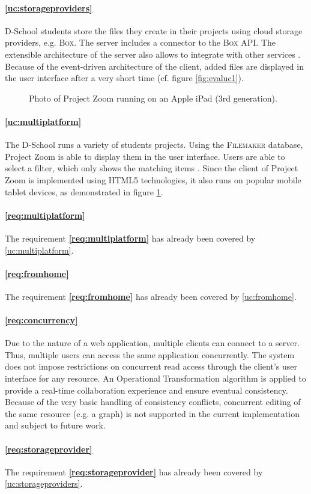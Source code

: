 \paragraph{\ref{uc:storageproviders}} D-School students store the files they create in their projects using cloud storage providers, e.g. \textsc{Box}. The server includes a connector to the \textsc{Box} API. The extensible architecture of the server also allows to integrate with other services \cite{Werkmeister_2013}. Because of the event-driven architecture of the client, added files are displayed in the user interface after a very short time (cf. figure \ref{fig:evaluc1}).

\begin{figure}
\begin{center}
\caption{Photo of Project Zoom running on an Apple iPad (3rd generation).}
\label{fig:evaluc6}
\end{center}
\end{figure}

\paragraph{\ref{uc:multiplatform}} The D-School runs a variety of students projects. Using the \textsc{Filemaker} database, Project Zoom is able to display them in the user interface. Users are able to select a filter, which only shows the matching items \cite{Dieckhoff_2013}. Since the client of Project Zoom is implemented using HTML5 technologies, it also runs on popular mobile tablet devices, as demonstrated in figure \ref{fig:evaluc6}.

\paragraph{\ref{req:multiplatform}} The requirement \textbf{\ref{req:multiplatform}} has already been covered by \ref{uc:multiplatform}.
\paragraph{\ref{req:fromhome}} The requirement \textbf{\ref{req:fromhome}} has already been covered by \ref{uc:fromhome}.
\paragraph{\ref{req:concurrency}} Due to the nature of a web application, multiple clients can connect to a server. Thus, multiple users can access the same application concurrently. The system does not impose restrictions on concurrent read access through the client's user interface for any resource. An Operational Transformation algorithm is applied to provide a real-time collaboration experience and ensure eventual consistency. Because of the very basic handling of consistency conflicts, concurrent editing of the same resource (e.g. a graph) is not supported in the current implementation and subject to future work.

\paragraph{\ref{req:storageprovider}} The requirement \textbf{\ref{req:storageprovider}} has already been covered by \ref{uc:storageproviders}.
